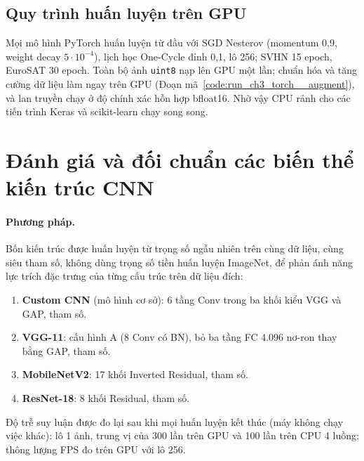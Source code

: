\subsection{Quy trình huấn luyện trên GPU}

Mọi mô hình PyTorch huấn luyện từ đầu với SGD Nesterov (momentum 0,9, weight decay $5\cdot10^{-4}$), lịch học One-Cycle
\cite{smith2019} đỉnh 0,1, lô 256; SVHN 15 epoch, EuroSAT 30 epoch. Toàn bộ ảnh \texttt{uint8} nạp lên GPU một lần; chuẩn
hóa và tăng cường dữ liệu làm ngay trên GPU (Đoạn mã~\ref{code:run_ch3_torch__augment}), và lan truyền chạy ở độ chính xác
hỗn hợp bfloat16. Nhờ vậy CPU rảnh cho các tiến trình Keras và scikit-learn chạy song song.


\section{Đánh giá và đối chuẩn các biến thể kiến trúc CNN}

\paragraph{Phương pháp.} Bốn kiến trúc được huấn luyện từ trọng số ngẫu nhiên trên cùng dữ liệu, cùng siêu tham số, không
dùng trọng số tiền huấn luyện ImageNet, để phản ánh năng lực trích đặc trưng của từng cấu trúc trên dữ liệu đích:
\begin{enumerate}
  \item \textbf{Custom CNN} (mô hình cơ sở): 6 tầng Conv trong ba khối kiểu VGG và GAP,  tham số.
  \item \textbf{VGG-11}: cấu hình A (8 Conv có BN), bỏ ba tầng FC 4.096 nơ-ron thay bằng GAP,  tham số.
  \item \textbf{MobileNetV2}: 17 khối Inverted Residual,  tham số.
  \item \textbf{ResNet-18}: 8 khối Residual,  tham số.
\end{enumerate}
Độ trễ suy luận được đo lại sau khi mọi huấn luyện kết thúc (máy không chạy việc khác): lô 1 ảnh, trung vị của 300 lần
trên GPU và 100 lần trên CPU 4 luồng; thông lượng FPS đo trên GPU với lô 256.


